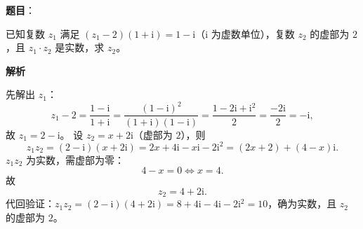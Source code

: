 \begin{answer}

\textbf{题目}：

已知复数 $z_1$ 满足 $(z_1-2)(1+\mathrm i)=1-\mathrm i$（$\mathrm i$ 为虚数单位），复数 $z_2$ 的虚部为 $2$，且 $z_1\cdot z_2$ 是实数，求 $z_2$。

\textbf{解析}

先解出 $z_1$：
\nopagebreak[4]
\[z_1-2=\frac{1-\mathrm i}{1+\mathrm i}=\frac{(1-\mathrm i)^2}{(1+\mathrm i)(1-\mathrm i)}=\frac{1-2\mathrm i+\mathrm i^2}{2}=\frac{-2\mathrm i}{2}=-\mathrm i,\]
故 $z_1=2-\mathrm i$。
设 $z_2=x+2\mathrm i$（虚部为 $2$），则
\nopagebreak[4]
\[z_1z_2=(2-\mathrm i)(x+2\mathrm i)=2x+4\mathrm i-x\mathrm i-2\mathrm i^2=(2x+2)+(4-x)\mathrm i.\]
$z_1z_2$ 为实数，需虚部为零：
\nopagebreak[4]
\[4-x=0\iff x=4.\]
故
\nopagebreak[4]
\[z_2=4+2\mathrm i.\]
代回验证：$z_1z_2=(2-\mathrm i)(4+2\mathrm i)=8+4\mathrm i-4\mathrm i-2\mathrm i^2=10$，确为实数，且 $z_2$ 的虚部为 $2$。


\end{answer}
